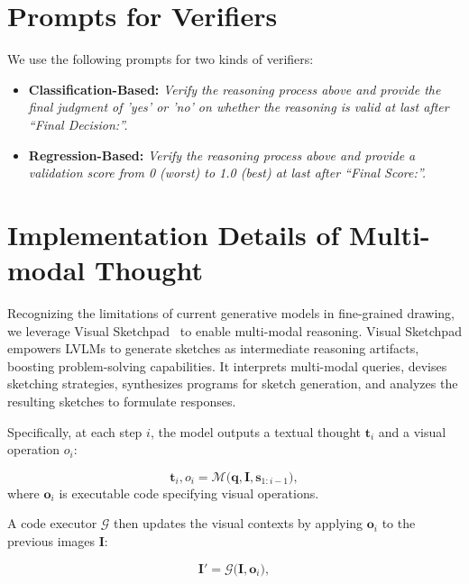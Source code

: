 


\section{Prompts for Verifiers}
\label{sec:app_verifier_inst}

We use the following prompts for two kinds of verifiers:

\begin{itemize}
    \item \textbf{Classification-Based:} \textit{Verify the reasoning process above and provide the final judgment of 'yes' or 'no' on whether the reasoning is valid at last after “Final Decision:”.}
    \item \textbf{Regression-Based:} \textit{Verify the reasoning process above and provide a validation score from 0 (worst) to 1.0 (best) at last after “Final Score:”.}
\end{itemize}





\section{Implementation Details of Multi-modal Thought}
\label{sec:app_vsk}

Recognizing the limitations of current generative models in fine-grained drawing, we leverage Visual Sketchpad~\cite{vsk} to enable multi-modal reasoning.  Visual Sketchpad empowers LVLMs to generate sketches as intermediate reasoning artifacts, boosting problem-solving capabilities. It interprets multi-modal queries, devises sketching strategies, synthesizes programs for sketch generation, and analyzes the resulting sketches to formulate responses.

 Specifically, at each step $i$, the model outputs a textual thought $\mathbf{t}_i$ and a visual operation $o_i$:

\begin{equation}
    \mathbf{t}_i, o_i = \mathcal{M}\big(\mathbf{q}, \mathbf{I}, \mathbf{s}_{1:i-1}\big),
\end{equation}
where $\mathbf{o}_i$ is executable code specifying visual operations.

A code executor $\mathcal{G}$ then updates the visual contexts by applying $\mathbf{o}_i$ to the previous images $\mathbf{I}$:

\begin{equation}
    \mathbf{I}' = \mathcal{G}\big(\mathbf{I}, \mathbf{o}_i\big),
\end{equation}


